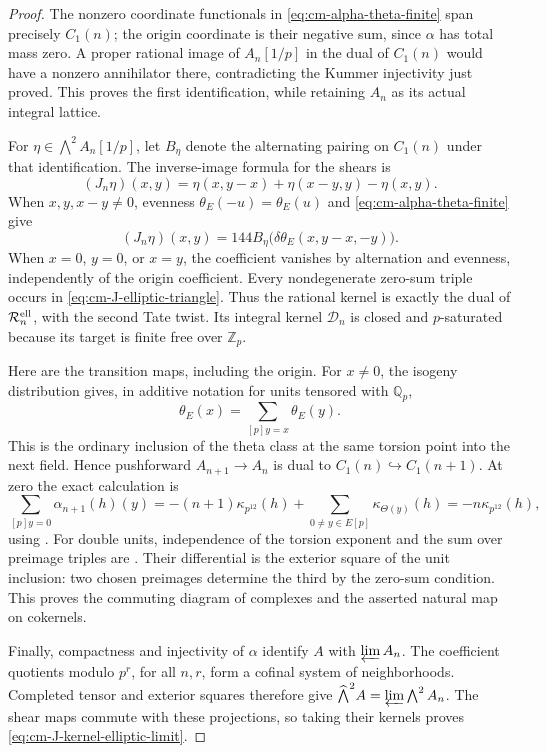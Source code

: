 \documentclass[11pt]{article}
\theoremstyle{definition}\newtheorem{definition}[theorem]{Definition}
\begin{document}
\begin{proof}
The nonzero coordinate functionals in
\eqref{eq:cm-alpha-theta-finite} span precisely
\(C_1(n)\); the origin coordinate is their negative
sum, since \(\alpha\) has total mass zero.
A proper rational image of \(A_n[1/p]\) in the dual
of \(C_1(n)\) would have a nonzero annihilator there,
contradicting the Kummer injectivity just proved.
This proves the first identification, while retaining
\(A_n\) as its actual integral lattice.

For \(\eta\in\bigwedge^2A_n[1/p]\), let
\(B_\eta\) denote the alternating pairing on \(C_1(n)\)
under that identification.  The inverse-image formula
for the shears is
\[
 (J_n\eta)(x,y)=\eta(x,y-x)+\eta(x-y,y)-\eta(x,y).
\]
When \(x,y,x-y\ne0\), evenness
\(\theta_E(-u)=\theta_E(u)\) and
\eqref{eq:cm-alpha-theta-finite} give
\begin{equation}\label{eq:cm-J-elliptic-triangle}
 (J_n\eta)(x,y)
       =144 B_\eta\bigl(\delta\theta_E(x,y-x,-y)\bigr).
\end{equation}
When \(x=0\), \(y=0\), or \(x=y\), the coefficient
vanishes by alternation and evenness, independently
of the origin coefficient.  Every nondegenerate
zero-sum triple occurs in
\eqref{eq:cm-J-elliptic-triangle}.
Thus the rational kernel is exactly the dual of
\(\mathcal R_n^{\rm ell}\), with the second Tate
twist.  Its integral kernel \(\mathcal D_n\) is
closed and \(p\)-saturated because its target is
finite free over \(\mathbb Z_p\).

Here are the transition maps, including the origin.
For \(x\ne0\), the isogeny distribution gives, in
additive notation for units tensored with \(\mathbb Q_p\),
\[
 \theta_E(x)=\sum_{[p]y=x}\theta_E(y).
\]
This is the ordinary inclusion of the theta class at
the same torsion point into the next field.  Hence
pushforward \(A_{n+1}\to A_n\) is dual to
\(C_1(n)\hookrightarrow C_1(n+1)\).
At zero the exact calculation is
\[
 \sum_{[p]y=0}\alpha_{n+1}(h)(y)
   =-(n+1)\kappa_{p^{12}}(h)
         +\sum_{0\ne y\in E[p]}\kappa_{\Theta(y)}(h)
   =-n\kappa_{p^{12}}(h),
\]
using \cite[Proposition (2.2)(3), p.~204]{Nakamura1995}.
For double units, independence of the torsion exponent
and the sum over preimage triples are
\cite[Lemma 2.12, p.~17, and equation (41), p.~16]{GoncharovEuler}.
Their differential is the exterior square of the
unit inclusion: two chosen preimages determine the
third by the zero-sum condition.  This proves the
commuting diagram of complexes and the asserted
natural map on cokernels.

Finally, compactness and injectivity of \(\alpha\)
identify \(A\) with \(\varprojlim A_n\).
The coefficient quotients modulo \(p^r\), for all
\(n,r\), form a cofinal system of neighborhoods.
Completed tensor and exterior squares therefore give
\(\widehat{\bigwedge}^2A=\varprojlim\bigwedge^2A_n\).
The shear maps commute with these projections,
so taking their kernels proves
\eqref{eq:cm-J-kernel-elliptic-limit}.
\end{proof}
\end{document}
